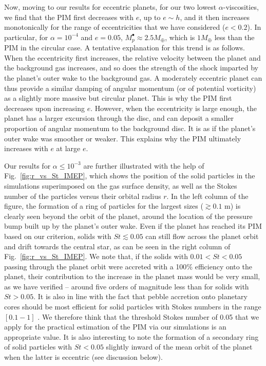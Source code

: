 \documentclass[fleqn,usenatbib]{mnras}
\begin{document}
Now, moving to our results for eccentric planets, for our two lowest $\alpha$-viscosities, we find that the PIM first decreases with $e$, up to $e\sim h$, and it then increases monotonically for the range of eccentricities that we have considered ($e<0.2$). In particular, for $\alpha=10^{-4}$ and $e=0.05$, $M_p^{\bullet} \approx2.5M_{\oplus}$, which is $1M_{\oplus}$ less than the PIM in the circular case. A tentative explanation for this trend is as follows. When the eccentricity first increases, the relative velocity between the planet and the background gas increases, and so does the strength of the shock imparted by the planet's outer wake to the background gas. A moderately eccentric planet can thus provide a similar damping of angular momentum (or of potential vorticity) as a slightly more massive but circular planet. This is why the PIM first decreases upon increasing $e$. However, when the eccentricity is large enough, the planet has a larger excursion through the disc, and can deposit a smaller proportion of angular momentum to the background disc. It is as if the planet's outer wake was smoother or weaker. This explains why the PIM ultimately increases with $e$ at large $e$.



Our results for $\alpha \leq 10^{-3}$ are further illustrated with the help of Fig.~\ref{fig:r_vs_St_IMEP}, which shows the position of the solid particles in the simulations superimposed on the gas surface density, as well as the Stokes number of the particles versus their orbital radius $r$. In the left column of the figure, the formation of a ring of particles for the largest sizes ($\gtrsim 0.1$ m) is clearly seen beyond the orbit of the planet, around the location of the pressure bump built up by the planet's outer wake. Even if the planet has reached its PIM based on our criterion, solids with $St \lesssim 0.05$ can still flow across the planet orbit and drift towards the central star, as can be seen in the right column of Fig.~\ref{fig:r_vs_St_IMEP}. We note that, if the solids with $0.01 < St < 0.05$ passing through the planet orbit were accreted with a 100$\%$ efficiency onto the planet, their contribution to the increase in the planet mass would be very small, as we have verified -- around five orders of magnitude less than for solids with $St>0.05$. It is also in line with the fact that pebble accretion onto planetary cores should be most efficient for solid particles with Stokes numbers in the range $[0.1-1]$ \citep[for a review see, e.g.,][]{2016SSRv..205...77B, 2017AREPS..45..359J}. We therefore think that the threshold Stokes number of 0.05 that we apply for the practical estimation of the PIM via our simulations is an appropriate value. It is also interesting to note the formation of a secondary ring of solid particles with $St<0.05$ slightly inward of the mean orbit of the planet when the latter is eccentric (see discussion below).
\end{document}
